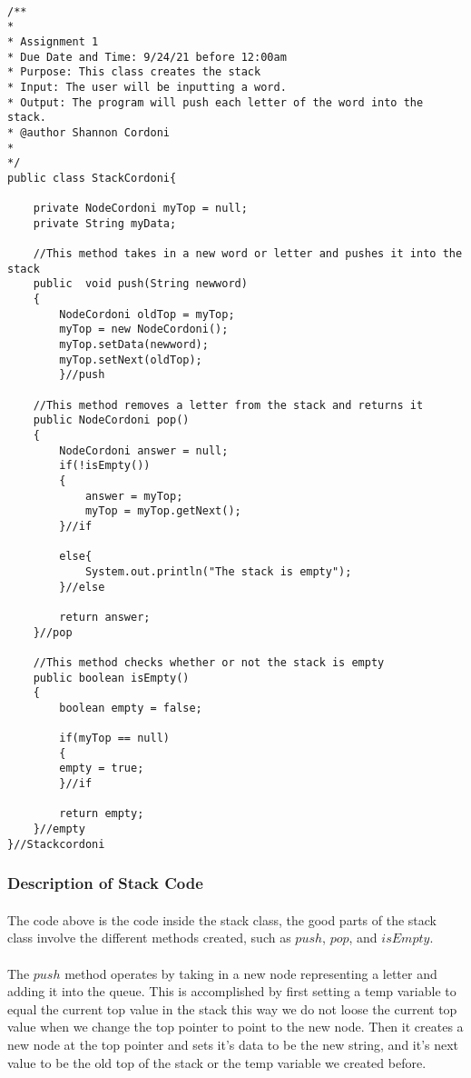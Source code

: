 \documentclass[letterpaper, 10pt,DIV=13]{scrartcl}
\numberwithin{equation}{section} %
\numberwithin{figure}{section} %
\numberwithin{table}{section} %
\begin{document}
\lstset{numbers=left, numberstyle=\tiny, stepnumber=1, numbersep=5pt, basicstyle=\footnotesize\ttfamily}
\begin{lstlisting}[frame=single, ] 
   
/** 
* 
* Assignment 1 
* Due Date and Time: 9/24/21 before 12:00am 
* Purpose: This class creates the stack 
* Input: The user will be inputting a word.
* Output: The program will push each letter of the word into the stack. 
* @author Shannon Cordoni 
* 
*/
public class StackCordoni{
    
    private NodeCordoni myTop = null;
	private String myData;
	
	//This method takes in a new word or letter and pushes it into the stack
	public  void push(String newword)
	{
	    NodeCordoni oldTop = myTop;
	    myTop = new NodeCordoni();
	    myTop.setData(newword);
	    myTop.setNext(oldTop);
	    }//push
	
	//This method removes a letter from the stack and returns it
	public NodeCordoni pop()
	{
	    NodeCordoni answer = null;
	    if(!isEmpty())
	    {
	        answer = myTop;
	        myTop = myTop.getNext();
	    }//if

	    else{
	        System.out.println("The stack is empty");
	    }//else
	        
	    return answer;
    }//pop
	
	//This method checks whether or not the stack is empty
	public boolean isEmpty()
	{
	    boolean empty = false;
	            
	    if(myTop == null)
	    {
	    empty = true;
	    }//if
	    
	    return empty;
	}//empty
}//Stackcordoni
\end{lstlisting}

\subsubsection{Description of Stack Code}
\paragraph{} The code above is the code inside the stack class, the good parts of the stack class involve the different methods created, such as $push$, $pop$, and $isEmpty$. \paragraph{} The $push$ method operates by taking in a new node representing a letter and adding it into the queue. This is accomplished by first setting a temp variable to equal the current top value in the stack this way we do not loose the current top value when we change the top pointer to point to the new node. Then it creates a new node at the top pointer and sets it's data to be the new string, and it's next value to be the old top of the stack or the temp variable we created before. 
\end{document}
